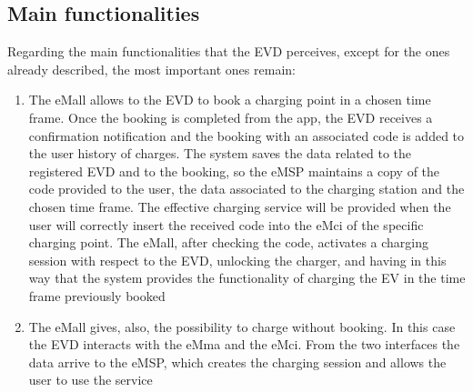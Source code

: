 \subsection{Main functionalities}
Regarding the main functionalities that the EVD perceives, except for the ones already described, the most important ones remain:
\clearpage
\begin{enumerate}
    \item The eMall allows to the EVD to book a charging point in a chosen time frame. Once the booking is completed from the app, the EVD receives a confirmation notification and the booking with an associated code is added to the user history of charges. The system saves the data related to the registered EVD and to the booking, so the eMSP maintains a copy of the code provided to the user, the data associated to the charging station and the chosen time frame. The effective charging service will be provided when the user will correctly insert the received code into the eMci of the specific charging point. The eMall, after checking the code, activates a charging session with respect to the EVD, unlocking the charger, and having in this way that the system provides the functionality of charging the EV in the time frame previously booked
    \item The eMall gives, also, the possibility to charge without booking. In this case the EVD interacts  with the eMma and the eMci. From the two interfaces the data arrive to the eMSP, which creates the charging session and allows the user to use the service
\end{enumerate}